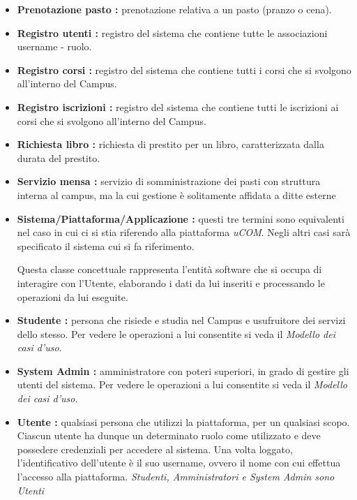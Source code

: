 \begin{itemize}
	\item \textbf{Prenotazione pasto :} prenotazione relativa a un pasto (pranzo o cena).
	
	\item \textbf{Registro utenti :} registro del sistema che contiene tutte le associazioni username - ruolo.
	
	\item \textbf{Registro corsi :} registro del sistema che contiene tutti i corsi che si svolgono all'interno del Campus.
	
	\item \textbf{Registro iscrizioni :} registro del sistema che contiene tutti le iscrizioni ai corsi che si svolgono all'interno del Campus.
	
	\item \textbf{Richiesta libro :} richiesta di prestito per un libro, caratterizzata dalla durata del prestito.
	
	\item \textbf{Servizio mensa :} servizio di somministrazione dei pasti con struttura interna al campus, ma la cui gestione è solitamente affidata a ditte esterne
	
	\item \textbf{Sistema/Piattaforma/Applicazione :} questi tre termini sono equivalenti nel caso in cui ci si stia riferendo alla piattaforma \textit{uCOM}. Negli altri casi sarà specificato il sistema cui si fa riferimento. 
	
	Questa classe concettuale rappresenta l'entità software che si occupa di interagire con l'Utente, elaborando i dati da lui inseriti e processando le operazioni da lui eseguite.

	\item \textbf{Studente :} persona che risiede e studia nel Campus e usufruitore dei servizi dello stesso. Per vedere le operazioni a lui consentite si veda il \textit{Modello dei casi d'uso}.
	
	\item \textbf{System Admin :} amministratore con poteri superiori, in grado di gestire gli utenti del sistema. Per vedere le operazioni a lui consentite si veda il \textit{Modello dei casi d'uso}.	
	
	\item \textbf{Utente :} qualsiasi persona che utilizzi la piattaforma, per un qualsiasi scopo. Ciascun utente ha dunque un determinato ruolo come utilizzato e deve possedere credenziali per accedere al sistema. 
	Una volta loggato, l'identificativo dell'utente è il suo username, ovvero il nome con cui effettua l'accesso alla piattaforma. 
	\textit{Studenti, Amministratori e System Admin sono Utenti}
	
\end{itemize}